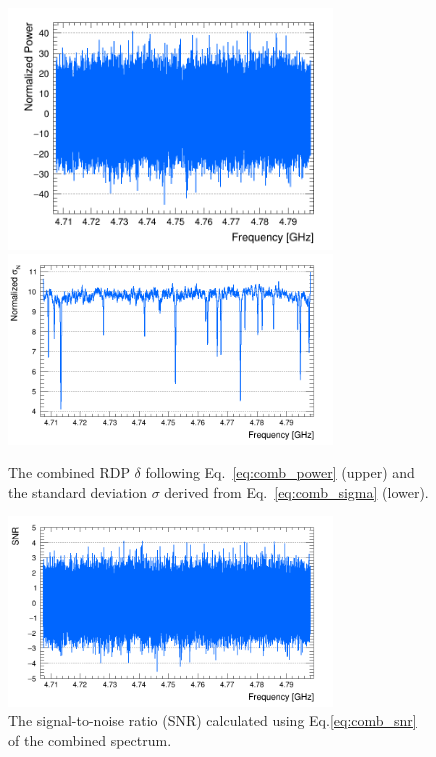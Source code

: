 \begin{figure}[h]
    \centering
    \includegraphics[width=8.6cm]{figures/Power_CombSpectrum_AxionRun_AllSteps_Rescan_SG4_W201_LqWeight.png}
    \includegraphics[width=8.6cm]{figures/Sigma_CombSpectrum_AxionRun_AllSteps_Rescan_SG4_W201_LqWeight.png}
    \caption{The combined RDP $\delta$ following Eq.~\eqref{eq:comb_power} 
(upper) and the standard deviation $\sigma$ derived from 
Eq.~\eqref{eq:comb_sigma} (lower).}
    \label{fig:power_sigma_comb}
\end{figure}

\begin{figure}[hbt!]
    \centering
    \includegraphics[width=8.6cm]{figures/SNR_CombSpectrum_AxionRun_AllSteps_Rescan_SG4_W201_LqWeight.png}
    \caption{The signal-to-noise ratio (SNR) calculated using 
Eq.\eqref{eq:comb_snr} of the combined spectrum. }
    \label{fig:SNR_comb}
\end{figure}


